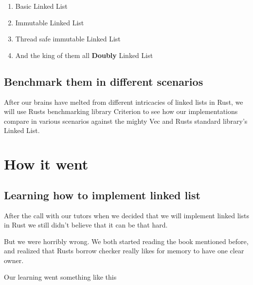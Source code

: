 \documentclass[11pt,twoside,a4paper]{article}
\begin{document}
\begin{enumerate}
    \item Basic Linked List
    \item Immutable Linked List
    \item Thread safe immutable Linked List
    \item And the king of them all \textbf{Doubly} Linked List
\end{enumerate}

\subsection*{Benchmark them in different scenarios}

After our brains have melted from different intricacies of linked lists in Rust,
we will use Rusts benchmarking library Criterion \cite{docsCriterionRust} to
see how our implementations compare in various scenarios against the mighty
Vec and Rusts standard library's Linked List.

\section{How it went}

\subsection*{Learning how to implement linked list}

After the call with our tutors when we decided that we will implement linked
lists in Rust we still didn't believe that it can be that hard.

But we were horribly wrong. We both started reading the book mentioned before,
and realized that Rusts borrow checker really likes for memory to have one clear
owner.

Our learning went something like this
\end{document}
